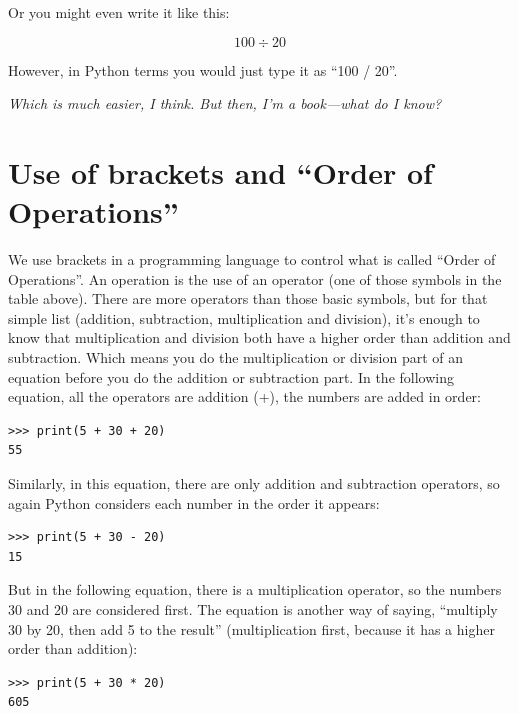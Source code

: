 Or you might even write it like this:

\begin{displaymath}
100 \div 20
\end{displaymath}

However, in Python terms you would just type it as ``100 / 20''.

\emph{Which is much easier, I think.  But then, I'm a book---what do I know?}

\section{Use of brackets and ``Order of Operations''}

We use brackets in a programming language to control what is called ``Order of Operations''.  An operation is the use of an operator (one of those symbols in the table above).  There are more operators than those basic symbols, but for that simple list (addition, subtraction, multiplication and division), it's enough to know that multiplication and division both have a higher order than addition and subtraction.  Which means you do the multiplication or division part of an equation before you do the addition or subtraction part.  In the following equation, all the operators are addition (+), the numbers are added in order:

\begin{listing}
\begin{verbatim}
>>> print(5 + 30 + 20)
55
\end{verbatim}
\end{listing}

\noindent
Similarly, in this equation, there are only addition and subtraction operators, so again Python considers each number in the order it appears:

\begin{listing}
\begin{verbatim}
>>> print(5 + 30 - 20)
15
\end{verbatim}
\end{listing}

\noindent
But in the following equation, there is a multiplication operator, so the numbers 30 and 20 are considered first.  The equation is another way of saying, ``multiply 30 by 20, then add 5 to the result'' (multiplication first, because it has a higher order than addition):

\begin{listing}
\begin{verbatim}
>>> print(5 + 30 * 20)
605
\end{verbatim}
\end{listing}

